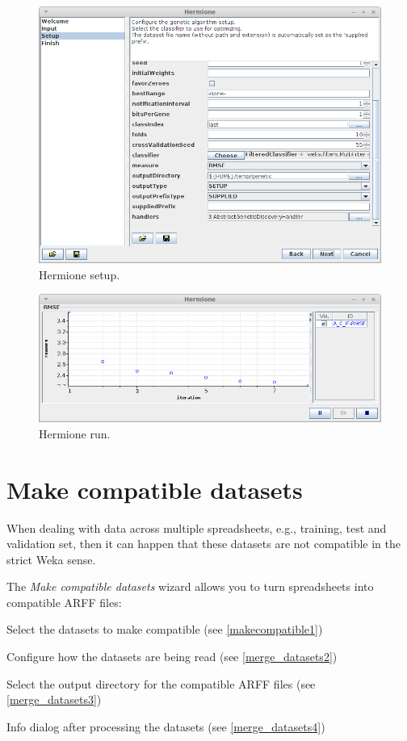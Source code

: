 \begin{figure}[htb]
  \centering
  \includegraphics[width=12.0cm]{images/hermione_setup.png}
  \caption{Hermione setup.}
  \label{hermione_setup}
\end{figure}

\begin{figure}[htb]
  \centering
  \includegraphics[width=12.0cm]{images/hermione_run.png}
  \caption{Hermione run.}
  \label{hermione_run}
\end{figure}

\clearpage
\section{Make compatible datasets}
When dealing with data across multiple spreadsheets, e.g., training, test
and validation set, then it can happen that these datasets are not compatible
in the strict Weka sense.

The \textit{Make compatible datasets} wizard allows you to turn spreadsheets
into compatible ARFF files:
\begin{tight_itemize}
  \item Select the datasets to make compatible (see \ref{makecompatible1})
  \item Configure how the datasets are being read (see \ref{merge_datasets2})
  \item Select the output directory for the compatible ARFF files (see \ref{merge_datasets3})
  \item Info dialog after processing the datasets (see \ref{merge_datasets4})
\end{tight_itemize}

